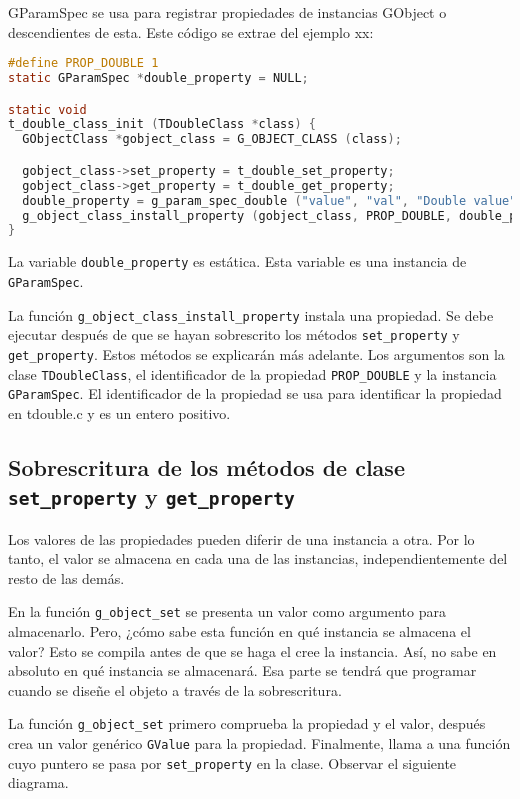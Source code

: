 \textsf{GParamSpec} se usa para registrar propiedades de instancias \textsf{GObject}
o descendientes de esta. Este código se extrae del ejemplo xx:
\begin{lstlisting}[language=C]
#define PROP_DOUBLE 1
static GParamSpec *double_property = NULL;

static void
t_double_class_init (TDoubleClass *class) {
  GObjectClass *gobject_class = G_OBJECT_CLASS (class);

  gobject_class->set_property = t_double_set_property;
  gobject_class->get_property = t_double_get_property;
  double_property = g_param_spec_double ("value", "val", "Double value", -G_MAXDOUBLE, G_MAXDOUBLE, 0.0, G_PARAM_READWRITE);
  g_object_class_install_property (gobject_class, PROP_DOUBLE, double_property);
}
\end{lstlisting}

La variable \texttt{double\_property} es estática. Esta variable es una instancia de \texttt{GParamSpec}.

La función \texttt{g\_object\_class\_install\_property} instala una propiedad.
Se debe ejecutar después de que se hayan sobrescrito los métodos \texttt{set\_property}
y \texttt{get\_property}. Estos métodos se explicarán más adelante. Los argumentos
son la clase \texttt{TDoubleClass}, el identificador de la propiedad
\texttt{PROP\_DOUBLE} y la instancia \texttt{GParamSpec}. El identificador de la
propiedad se usa para identificar la propiedad en \textsf{tdouble.c} y es un entero
positivo.

\subsection{Sobrescritura de los métodos de clase \texttt{set\_property} y
  \texttt{get\_property}}
Los valores de las propiedades pueden diferir de una instancia a otra. Por lo tanto,
el valor se almacena en cada una de las instancias, independientemente del resto de
las demás.

En la función \texttt{g\_object\_set} se presenta un valor como argumento para
almacenarlo. Pero, ¿cómo sabe esta función en qué instancia se almacena el valor?
Esto se compila antes de que se haga el cree la instancia. Así, no sabe en absoluto
en qué instancia se almacenará. Esa parte se tendrá que programar cuando se
diseñe el objeto a través de la sobrescritura.

La función \texttt{g\_object\_set} primero comprueba la propiedad y el valor, después
crea un valor genérico \texttt{GValue} para la propiedad. Finalmente, llama a una
función cuyo puntero se pasa por \texttt{set\_property} en la clase. Observar el
siguiente diagrama.




  

